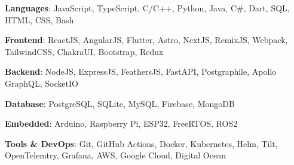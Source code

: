\textbf{Languages}: JavaScript, TypeScript, C/C++, Python, Java, C\#, Dart, SQL, HTML, CSS, Bash \par
\textbf{Frontend}: ReactJS, AngularJS, Flutter, Astro, NextJS, RemixJS, Webpack, TailwindCSS, ChakraUI, Bootstrap, Redux \par
\textbf{Backend}: NodeJS, ExpressJS, FeathersJS, FastAPI, Postgraphile, Apollo GraphQL, SocketIO \par
\textbf{Database}: PostgreSQL, SQLite, MySQL, Firebase, MongoDB \par
\textbf{Embedded}: Arduino, Raspberry Pi, ESP32, FreeRTOS, ROS2 \par
\textbf{Tools \& DevOps}: Git, GitHub Actions, Docker, Kubernetes, Helm, Tilt, OpenTelemtry, Grafana, AWS, Google Cloud, Digital Ocean